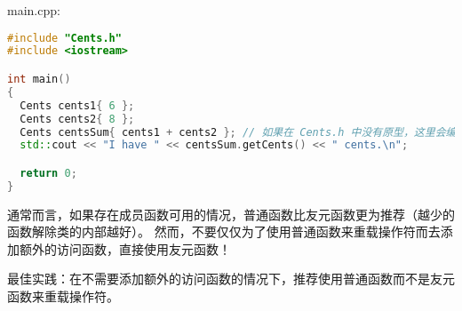 \documentclass[../../LearnCpp.tex]{subfiles}
\begin{document}
main.cpp:

\begin{lstlisting}[language=C++]
#include "Cents.h"
#include <iostream>

int main()
{
  Cents cents1{ 6 };
  Cents cents2{ 8 };
  Cents centsSum{ cents1 + cents2 }; // 如果在 Cents.h 中没有原型，这里会编译错误
  std::cout << "I have " << centsSum.getCents() << " cents.\n";

  return 0;
}
\end{lstlisting}

通常而言，如果存在成员函数可用的情况，普通函数比友元函数更为推荐（越少的函数解除类的内部越好）。
然而，不要仅仅为了使用普通函数来重载操作符而去添加额外的访问函数，直接使用友元函数！

最佳实践：在不需要添加额外的访问函数的情况下，推荐使用普通函数而不是友元函数来重载操作符。
\end{document}
